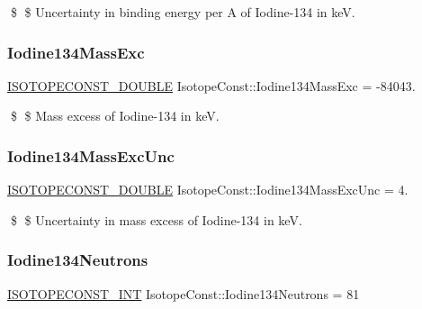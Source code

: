 \$ \$ Uncertainty in binding energy per A of Iodine-\/134 in keV. \mbox{\label{group___isotope_const-_iodine-_i134_ga7a00c87a48e5dd9095968128077c68e5}} 
\subsubsection{\texorpdfstring{Iodine134\+Mass\+Exc}{Iodine134MassExc}}
{\footnotesize\ttfamily \mbox{\hyperlink{group___isotope_const-_macros_ga8f45a7272ce02c0b4c65c44636ed719a}{I\+S\+O\+T\+O\+P\+E\+C\+O\+N\+S\+T\+\_\+\+D\+O\+U\+B\+LE}} Isotope\+Const\+::\+Iodine134\+Mass\+Exc = -\/84043.}

\$ \$ Mass excess of Iodine-\/134 in keV. \mbox{\label{group___isotope_const-_iodine-_i134_gac30e3823eef2d9bd20465c74f7c6f829}} 
\subsubsection{\texorpdfstring{Iodine134\+Mass\+Exc\+Unc}{Iodine134MassExcUnc}}
{\footnotesize\ttfamily \mbox{\hyperlink{group___isotope_const-_macros_ga8f45a7272ce02c0b4c65c44636ed719a}{I\+S\+O\+T\+O\+P\+E\+C\+O\+N\+S\+T\+\_\+\+D\+O\+U\+B\+LE}} Isotope\+Const\+::\+Iodine134\+Mass\+Exc\+Unc = 4.}

\$ \$ Uncertainty in mass excess of Iodine-\/134 in keV. \mbox{\label{group___isotope_const-_iodine-_i134_ga6fc880a1989d98062f5e6bcecbf4f7bf}} 
\subsubsection{\texorpdfstring{Iodine134\+Neutrons}{Iodine134Neutrons}}
{\footnotesize\ttfamily \mbox{\hyperlink{group___isotope_const-_macros_ga5f18360b3e99483a35c32d789e62621c}{I\+S\+O\+T\+O\+P\+E\+C\+O\+N\+S\+T\+\_\+\+I\+NT}} Isotope\+Const\+::\+Iodine134\+Neutrons = 81}

